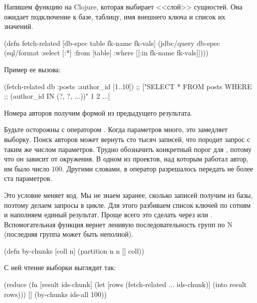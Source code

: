 Напишем функцию на Clojure, которая выбирает <<слой>> сущностей. Она ожидает подключение к базе, таблицу, имя внешнего ключа и список их значений.

\begin{english}
  \begin{clojure}
(defn fetch-related
  [db-spec table fk-name fk-vals]
  (jdbc/query
   db-spec
   (sql/format
   {:select [:*]
    :from [table]
    :where [[:in fk-name fk-vals]]})))
  \end{clojure}
\end{english}

Пример ее вызова:

\begin{english}
  \begin{clojure}
(fetch-related db :posts :author_id [1..10])
;; ["SELECT * FROM posts WHERE
;;   (author_id IN (?, ?, ...))" 1 2 ...]
  \end{clojure}
\end{english}

Номера авторов получим формой  из предыдущего результата.

Будьте осторожны с оператором . Когда параметров много, это замедляет выборку. Поиск авторов может вернуть сто тысяч записей, что породит запрос с таким же числом параметров. Трудно обозначить конкретный порог для , потому что он зависит от окружения. В одном из проектов, над которым работал автор, им было число 100. Другими словами, в оператор  разрешалось передать не более ста параметров.

Это условие меняет код. Мы не знаем заранее, сколько записей получим из базы, поэтому делаем запросы в цикле. Для этого разбиваем список ключей по сотням и наполняем единый результат. Проще всего это сделать через  или . Вспомогательная функция  вернет ленивую последовательность групп по N (последняя группа может быть неполной).


\begin{english}
  \begin{clojure}
(defn by-chunks
  [coll n]
  (partition n n [] coll))
  \end{clojure}
\end{english}

\pagebreaklarge

С ней чтение выборки выглядит так:

\begin{english}
  \begin{clojure}
(reduce
 (fn [result ids-chunk]
   (let [rows (fetch-related ... ids-chunk)]
     (into result rows)))
 []
 (by-chunks ids-all 100))
  \end{clojure}
\end{english}

